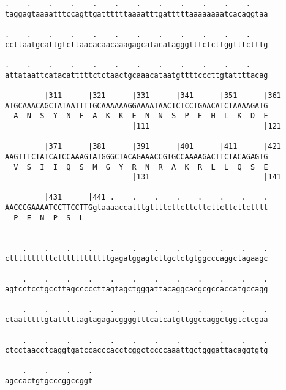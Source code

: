 \documentclass{article}
\begin{document}
\begin{Verbatim}
.    .    .    .    .    .    .    .    .    .    .    .    
taggagtaaaatttccagttgattttttaaaatttgatttttaaaaaaaatcacaggtaa
                                                            
.    .    .    .    .    .    .    .    .    .    .    .    
ccttaatgcattgtcttaacacaacaaagagcatacatagggtttctcttggtttctttg
                                                            
.    .    .    .    .    .    .    .    .    .    .    .    
attataattcatacatttttctctaactgcaaacataatgttttcccttgtattttacag
                                                            
         |311      |321      |331      |341      |351      |361
ATGCAAACAGCTATAATTTTGCAAAAAAGGAAAATAACTCTCCTGAACATCTAAAAGATG
  A  N  S  Y  N  F  A  K  K  E  N  N  S  P  E  H  L  K  D  E
                             |111                          |121
  
         |371      |381      |391      |401      |411      |421
AAGTTTCTATCATCCAAAGTATGGGCTACAGAAACCGTGCCAAAAGACTTCTACAGAGTG
  V  S  I  I  Q  S  M  G  Y  R  N  R  A  K  R  L  L  Q  S  E
                             |131                          |141
  
         |431      |441 .    .    .    .    .    .    .    .
AACCCGAAAATCCTTCCTTGgtaaaaccatttgttttcttcttcttcttcttcttctttt
  P  E  N  P  S  L                                          
                                                            
  
    .    .    .    .    .    .    .    .    .    .    .    .
cttttttttttcttttttttttttgagatggagtcttgctctgtggcccaggctagaagc
                                                            
    .    .    .    .    .    .    .    .    .    .    .    .
agtcctcctgccttagcccccttagtagctgggattacaggcacgcgccaccatgccagg
                                                            
    .    .    .    .    .    .    .    .    .    .    .    .
ctaatttttgtatttttagtagagacggggtttcatcatgttggccaggctggtctcgaa
                                                            
    .    .    .    .    .    .    .    .    .    .    .    .
ctcctaacctcaggtgatccacccacctcggctccccaaattgctgggattacaggtgtg
                                                            
    .    .    .    .
agccactgtgcccggccggt
                    
                    
 

\end{Verbatim}
\end{document}
